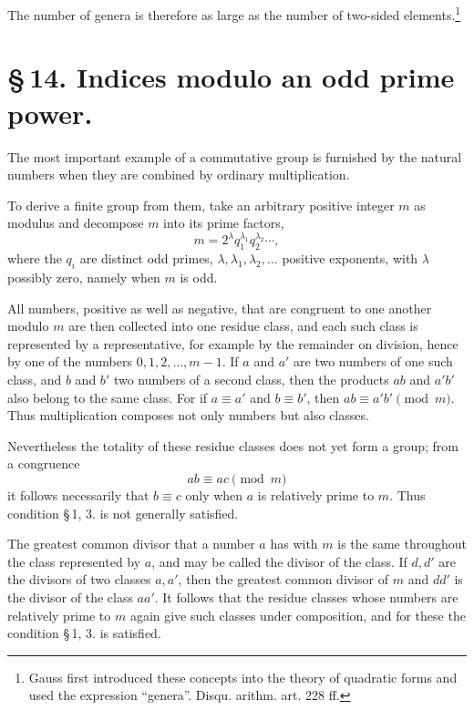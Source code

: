 \documentclass[11pt]{article}
\begin{document}
The number of genera is therefore as large as the number of two-sided elements.\footnote{Gauss first introduced these concepts into the theory of quadratic forms and used the expression ``genera''. Disqu. arithm. art. 228 ff.}

\section*{\S\,14. Indices modulo an odd prime power.}

The most important example of a commutative group is furnished by the natural numbers when they are combined by ordinary multiplication.

To derive a finite group from them, take an arbitrary positive integer $m$ as modulus and decompose $m$ into its prime factors,
\begin{equation}
m=2^\lambda q_1^{\lambda_1}q_2^{\lambda_2}\cdots,
\tag{1}
\end{equation}
where the $q_i$ are distinct odd primes, $\lambda,\lambda_1,
\lambda_2,
\ldots$ positive exponents, with $\lambda$ possibly zero, namely when $m$ is odd.

All numbers, positive as well as negative, that are congruent to one another modulo $m$ are then collected into one residue class, and each such class is represented by a representative, for example by the remainder on division, hence by one of the numbers $0,1,2,
\ldots,m-1$. If $a$ and $a'$ are two numbers of one such class, and $b$ and $b'$ two numbers of a second class, then the products $ab$ and $a'b'$ also belong to the same class. For if $a\equiv a'$ and $b\equiv b'$, then $ab\equiv a'b'\pmod m$. Thus multiplication composes not only numbers but also classes.

Nevertheless the totality of these residue classes does not yet form a group; from a congruence
\[
ab\equiv ac\pmod m
\]
it follows necessarily that $b\equiv c$ only when $a$ is relatively prime to $m$. Thus condition \S\,1, 3. is not generally satisfied.

The greatest common divisor that a number $a$ has with $m$ is the same throughout the class represented by $a$, and may be called the divisor of the class. If $d,d'$ are the divisors of two classes $a,a'$, then the greatest common divisor of $m$ and $dd'$ is the divisor of the class $aa'$. It follows that the residue classes whose numbers are relatively prime to $m$ again give such classes under composition, and for these the condition \S\,1, 3. is satisfied.
\end{document}
